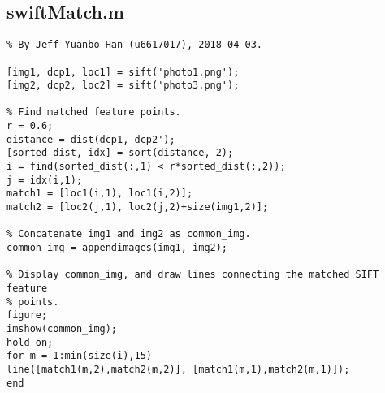 \documentclass{article}
\begin{document}
\subsection{swiftMatch.m}
\label{code-3}
\begin{lstlisting}
% By Jeff Yuanbo Han (u6617017), 2018-04-03.

[img1, dcp1, loc1] = sift('photo1.png');
[img2, dcp2, loc2] = sift('photo3.png');

% Find matched feature points.
r = 0.6;
distance = dist(dcp1, dcp2');
[sorted_dist, idx] = sort(distance, 2);
i = find(sorted_dist(:,1) < r*sorted_dist(:,2));
j = idx(i,1);
match1 = [loc1(i,1), loc1(i,2)];
match2 = [loc2(j,1), loc2(j,2)+size(img1,2)];

% Concatenate img1 and img2 as common_img.
common_img = appendimages(img1, img2);

% Display common_img, and draw lines connecting the matched SIFT feature
% points.
figure;
imshow(common_img);
hold on;
for m = 1:min(size(i),15)
line([match1(m,2),match2(m,2)], [match1(m,1),match2(m,1)]);
end

\end{lstlisting}
\end{document}
